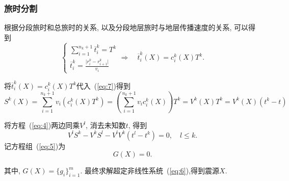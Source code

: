 \documentclass{article}
\begin{document}
\begin{CJK*}{UTF8}{gkai}
\subsubsection{旅时分割}
根据分段旅时和总旅时的关系, 以及分段地层旅时与地层传播速度的关系, 可以得到
\begin{equation}
\begin{cases}
\sum^{n_k+1}_{i=1} \overline{t}^k_i = T^k\\
\overline{t}^k_i = \frac{\vert r^k_i - r^k_{i+1} \vert}{v_i}
\end{cases}
\Rightarrow \quad \overline{t}^k_i(X) = c^k_i(X) T^k.
\end{equation}

将$\overline{t}^k_i(X) = c^k_i(X) T^k$代入~(\ref{eq:7})得到
\begin{equation}\label{eq:4}
S^k(X) = \sum^{n_k+1}_{i=1} v_i\left(c^k_i(X) T^k\right)  = \left(\sum^{n_k+1}_{i=1} v_ic^k_i(X)\right) T^k = V^k(X)T^k = V^k(X)(t^k-t)
\end{equation}


将方程~(\ref{eq:4})两边同乘$V^l$, 消去未知数$t$, 得到
\begin{equation}\label{eq:5}
V^lS^k - V^kS^l - V^lV^k(t^l-t^k) =0, \quad l\leq k.
\end{equation}
记方程组~(\ref{eq:5})为
\begin{equation}\label{eq:6}
G(X) = 0.
\end{equation}

其中, $G(X) = \{ g_i\}_{i=1}^{m}$. 最终求解超定非线性系统~(\ref{eq:6}),得到震源$X$. 














\end{CJK*}
\end{document}
